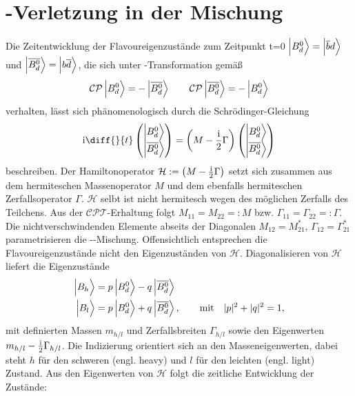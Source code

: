 \section{\CP-Verletzung in der Mischung}
Die Zeitentwicklung der Flavoureigenzustände zum Zeitpunkt t=0 $\Ket{\text{\Bd}\vphantom{\text{\Bdbar}}} = \Ket{\overline{b}d\vphantom{\text{\Bdbar}}}$ und $\Ket{\text{\Bdbar}} = \Ket{b\overline{d}\vphantom{\text{\Bdbar}}}$, die sich unter \CP-Transformation gemäß
\begin{align}
\text{\CP}\Ket{\text{\Bd}\vphantom{\text{\Bdbar}}} = -\Ket{\text{\Bdbar}} \qquad \text{\CP}\Ket{\text{\Bdbar}} = -\Ket{\text{\Bd}\vphantom{\text{\Bdbar}}}
\end{align} 
verhalten, lässt sich phänomenologisch durch die Schrödinger-Gleichung
\begin{align}
\im \diff{}{t}\begin{pmatrix} \Ket{\text{\Bd}\vphantom{\text{\Bdbar}}} \\ \Ket{\text{\Bdbar}} \end{pmatrix} = \left(M - \frac{\im}{2} \Gamma\right) \begin{pmatrix} \Ket{\text{\Bd}\vphantom{\text{\Bdbar}}} \\ \Ket{\text{\Bdbar}} \end{pmatrix}
\end{align}
beschreiben. Der Hamiltonoperator $\mathcal{H}:=\left(M - \frac{\mathrm{i}}{2} \Gamma\right)$ setzt sich zusammen aus dem hermiteschen Massenoperator $M$ und dem ebenfalls hermiteschen Zerfallsoperator $\Gamma$. $\mathcal{H}$ selbt ist nicht hermitesch wegen des möglichen Zerfalls des Teilchens. Aus der $\mathcal{CPT}$-Erhaltung folgt $M_{11}=M_{22}=:M$ bzw. $\Gamma_{11}=\Gamma_{22}=:\Gamma$. Die nichtverschwindenden Elemente abseits der Diagonalen $M_{12}=M_{21}^*$, $\Gamma_{12}=\Gamma_{21}^*$ parametrisieren die \Bd-\Bdbar-Mischung. Offensichtlich entsprechen die Flavoureigenzustände nicht den Eigenzuständen von $\mathcal{H}$. Diagonalisieren von $\mathcal{H}$ liefert die Eigenzustände
\begin{align}
\Ket{B_h\vphantom{\text{\Bdbar}}} &= p \Ket{\text{\Bd}\vphantom{\text{\Bdbar}}} - q \Ket{\text{\Bdbar}} \label{eq:b_heavy}\\ 
\Ket{B_l\vphantom{\text{\Bdbar}}} &= p \Ket{\text{\Bd}\vphantom{\text{\Bdbar}}} + q \Ket{\text{\Bdbar}}, \qquad \text{mit} \quad |p|^2 + |q|^2 = 1, \label{eq:b_light}
\end{align}
mit definierten Massen $m_{h/l}$ und Zerfallsbreiten $\Gamma_{h/l}$ sowie den Eigenwerten  $m_{h/l}-\frac{\mathrm{i}}{2}\Gamma_{h/l}$. Die Indizierung orientiert sich an den Masseneigenwerten, dabei steht $h$ für den schweren (engl. heavy) und $l$ für den leichten (engl. light) Zustand. Aus den Eigenwerten von $\mathcal{H}$ folgt die zeitliche Entwicklung der Zustände:
